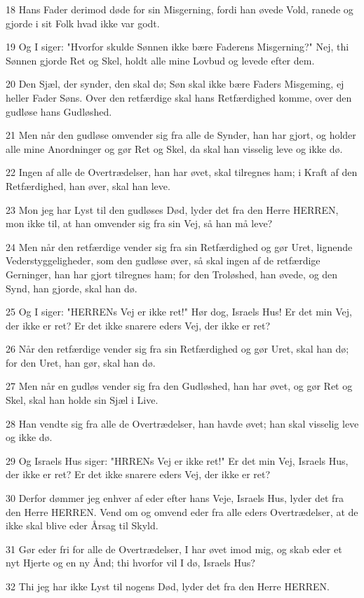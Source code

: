 \par 18 Hans Fader derimod døde for sin Misgerning, fordi han øvede Vold, ranede og gjorde i sit Folk hvad ikke var godt.
\par 19 Og I siger: "Hvorfor skulde Sønnen ikke bære Faderens Misgerning?" Nej, thi Sønnen gjorde Ret og Skel, holdt alle mine Lovbud og levede efter dem.
\par 20 Den Sjæl, der synder, den skal dø; Søn skal ikke bære Faders Misgeming, ej heller Fader Søns. Over den retfærdige skal hans Retfærdighed komme, over den gudløse hans Gudløshed.
\par 21 Men når den gudløse omvender sig fra alle de Synder, han har gjort, og holder alle mine Anordninger og gør Ret og Skel, da skal han visselig leve og ikke dø.
\par 22 Ingen af alle de Overtrædelser, han har øvet, skal tilregnes ham; i Kraft af den Retfærdighed, han øver, skal han leve.
\par 23 Mon jeg har Lyst til den gudløses Død, lyder det fra den Herre HERREN, mon ikke til, at han omvender sig fra sin Vej, så han må leve?
\par 24 Men når den retfærdige vender sig fra sin Retfærdighed og gør Uret, lignende Vederstyggeligheder, som den gudløse øver, så skal ingen af de retfærdige Gerninger, han har gjort tilregnes ham; for den Troløshed, han øvede, og den Synd, han gjorde, skal han dø.
\par 25 Og I siger: "HERRENs Vej er ikke ret!" Hør dog, Israels Hus! Er det min Vej, der ikke er ret? Er det ikke snarere eders Vej, der ikke er ret?
\par 26 Når den retfærdige vender sig fra sin Retfærdighed og gør Uret, skal han dø; for den Uret, han gør, skal han dø.
\par 27 Men når en gudløs vender sig fra den Gudløshed, han har øvet, og gør Ret og Skel, skal han holde sin Sjæl i Live.
\par 28 Han vendte sig fra alle de Overtrædelser, han havde øvet; han skal visselig leve og ikke dø.
\par 29 Og Israels Hus siger: "HRRENs Vej er ikke ret!" Er det min Vej, Israels Hus, der ikke er ret? Er det ikke snarere eders Vej, der ikke er ret?
\par 30 Derfor dømmer jeg enhver af eder efter hans Veje, Israels Hus, lyder det fra den Herre HERREN. Vend om og omvend eder fra alle eders Overtrædelser, at de ikke skal blive eder Årsag til Skyld.
\par 31 Gør eder fri for alle de Overtrædelser, I har øvet imod mig, og skab eder et nyt Hjerte og en ny Ånd; thi hvorfor vil I dø, Israels Hus?
\par 32 Thi jeg har ikke Lyst til nogens Død, lyder det fra den Herre HERREN.

